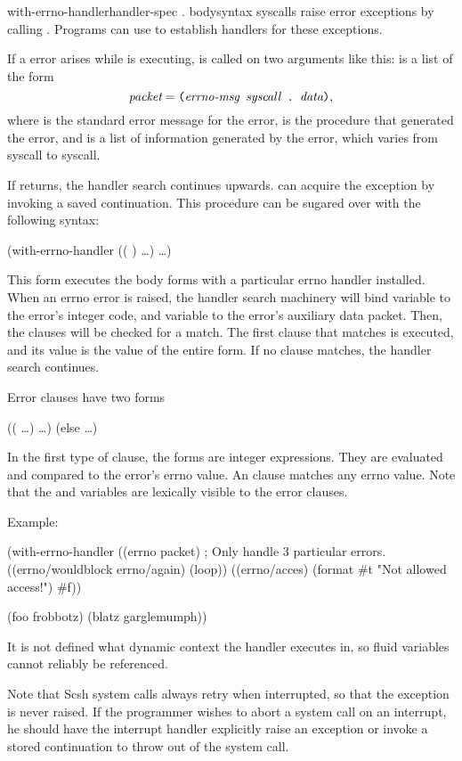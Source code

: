 \begin{dfndescx}
    {with-errno-handler}{handler-spec . body}{}{syntax}
{\Unix} syscalls raise error exceptions by calling .
Programs can use  to establish
handlers for these exceptions.

If a {\Unix} error arises while  is executing, 
 is called on two arguments like this:
 is a list of the form
     $$\var{packet} = \ex{(\var{errno-msg} \var{syscall} . \var{data})},$$
where  is the standard {\Unix} error message for the error,
       is the procedure that generated the error,
and    is a list of information generated by the error,
      which varies from syscall to syscall.

If  returns, the handler search continues upwards.
 can acquire the exception by invoking a saved continuation.
This procedure can be sugared over with the following syntax:
%
\begin{code}
(with-errno-handler
    (( )  \ldots)
  \ldots)\end{code}
%
This form executes the body forms with a particular errno handler installed.
When an errno error is raised, the handler search machinery will
bind variable  to the error's integer code, and variable
 to the error's auxiliary data packet.
Then, the clauses will be checked for a match.
The first clause that matches is executed, and its value is the
value of the entire  form.
If no clause matches, the handler search continues.

Error clauses have two forms
%
\begin{code}
(( \ldots)  \ldots)
(else  \ldots)\end{code}
%
In the first type of clause, the  forms are integer expressions.
They are evaluated and compared to the error's errno value.
An  clause matches any errno value. 
Note that the  and 
variables are lexically visible to the error clauses.

Example:
\begin{code}    
(with-errno-handler 
    ((errno packet) ; Only handle 3 particular errors.
     ((errno/wouldblock errno/again)
      (loop))
     ((errno/acces)
      (format #t "Not allowed access!")
      #f))

  (foo frobbotz)
  (blatz garglemumph))\end{code}
%
It is not defined what dynamic context the handler executes in,
so fluid variables cannot reliably be referenced.

Note that Scsh system calls always retry when interrupted, so that
the  exception is never raised.
If the programmer wishes to abort a system call on an interrupt, he
should have the interrupt handler explicitly raise an exception or
invoke a stored continuation to throw out of the system call.
\end{dfndescx}


